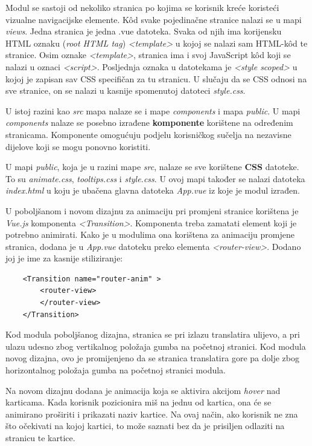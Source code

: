 \documentclass[times, utf8, zavrsni, numeric]{fer}
\begin{document}
    Modul se sastoji od nekoliko stranica po kojima se korisnik kreće koristeći vizualne navigacijske elemente. Kôd svake pojedinačne stranice nalazi se u mapi \textit{views}. Jedna stranica je jedna .vue datoteka. Svaka od njih ima korijensku HTML oznaku (\textit{root HTML tag}) \textit{<template>} u kojoj se nalazi sam HTML-kôd te stranice. Osim oznake \textit{<template>}, stranica ima i svoj JavaScript kôd koji se nalazi u oznaci \textit{<script>}. Posljednja oznaka u datotekama je \textit{<style scoped>} u kojoj je zapisan sav CSS specifičan za tu stranicu. U slučaju da se CSS odnosi na sve stranice, on se nalazi u kasnije spomenutoj datoteci \textit{style.css}.
    
    U istoj razini kao \textit{src} mapa nalaze se i mape \textit{components} i mapa \textit{public}. U mapi \textit{components} nalaze se posebno izrađene \textbf{komponente} korištene na određenim stranicama. Komponente omogućuju podjelu korisničkog sučelja na nezavisne dijelove koji se mogu ponovno koristiti.
    
    U mapi \textit{public}, koja je u razini mape \textit{src}, nalaze se sve korištene \textbf{CSS} datoteke. To su \textit{animate.css}, \textit{tooltips.css} i \textit{style.css}. U ovoj mapi također se nalazi datoteka \textit{index.html} u koju je ubačena glavna datoteka \textit{App.vue} iz koje je modul izrađen.
    
    U poboljšanom i novom dizajnu za animaciju pri promjeni stranice korištena je \textit{Vue.js} komponenta \textit{<Transition>}. Komponenta treba zamatati element koji je potrebno animirati. Kako je u modulima ona korištena za animaciju promjene stranica, dodana je u \textit{App.vue} datoteku preko elementa \textit{<router-view>}. Dodano joj je ime za kasnije stiliziranje:
    \begin{verbatim}
    <Transition name="router-anim" >
        <router-view>
        </router-view>
    </Transition>
    \end{verbatim}
    
    Kod modula poboljšanog dizajna, stranica se pri izlazu translatira ulijevo, a pri ulazu udesno zbog vertikalnog položaja gumba na početnoj stranici. Kod modula novog dizajna, ovo je promijenjeno da se stranica translatira gore pa dolje zbog horizontalnog položaja gumba na početnoj stranici modula.
        
    Na novom dizajnu dodana je animacija koja se aktivira akcijom \textit{hover} nad karticama. Kada korisnik pozicionira miš na jednu od kartica, ona će se animirano proširiti i prikazati naziv kartice. Na ovaj način, ako korisnik ne zna što očekivati na kojoj kartici, to može saznati bez da je prisiljen odlaziti na stranicu te kartice.
    
\end{document}
